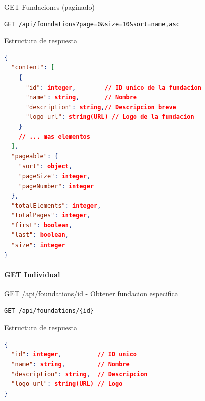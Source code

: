 \documentclass[11pt,a4paper]{article}
\begin{document}
\begin{center}
	\begin{minipage}{\textwidth}
		\begin{codebox}{GET Fundaciones (paginado)}
			\begin{lstlisting}[language=HTTP]
GET /api/foundations?page=0&size=10&sort=name,asc
\end{lstlisting}
		\end{codebox}
	\end{minipage}
\end{center}

\begin{center}
	\begin{minipage}{\textwidth}
		\begin{codebox}{Estructura de respuesta}
			\begin{lstlisting}[language=json]
{
  "content": [
    {
      "id": integer,        // ID unico de la fundacion
      "name": string,       // Nombre
      "description": string,// Descripcion breve
      "logo_url": string(URL) // Logo de la fundacion
    }
    // ... mas elementos
  ],
  "pageable": {
    "sort": object,
    "pageSize": integer,
    "pageNumber": integer
  },
  "totalElements": integer,
  "totalPages": integer,
  "first": boolean,
  "last": boolean,
  "size": integer
}
\end{lstlisting}
		\end{codebox}
	\end{minipage}
\end{center}

\paragraph{GET Individual}

\begin{center}
	\begin{minipage}{\textwidth}
		\begin{codebox}{GET /api/foundations/{id} - Obtener fundacion especifica}
			\begin{lstlisting}[language=HTTP]
GET /api/foundations/{id}
\end{lstlisting}
		\end{codebox}
	\end{minipage}
\end{center}

\begin{center}
	\begin{minipage}{\textwidth}
		\begin{codebox}{Estructura de respuesta}
			\begin{lstlisting}[language=json]
{
  "id": integer,          // ID unico
  "name": string,         // Nombre
  "description": string,  // Descripcion
  "logo_url": string(URL) // Logo
}
\end{lstlisting}
		\end{codebox}
	\end{minipage}
\end{center}
\end{document}
